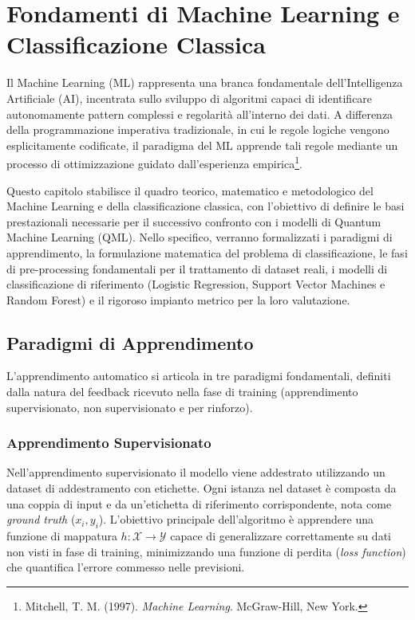 \chapter{Fondamenti di Machine Learning e Classificazione Classica}
\label{cap:fondamenti_ml_classificazione_classica}

Il Machine Learning (ML) rappresenta una branca fondamentale dell'Intelligenza Artificiale (AI), incentrata sullo sviluppo di algoritmi capaci di identificare autonomamente pattern complessi e regolarità all'interno dei dati. A differenza della programmazione imperativa tradizionale, in cui le regole logiche vengono esplicitamente codificate, il paradigma del ML apprende tali regole mediante un processo di ottimizzazione guidato dall'esperienza empirica\footnote{Mitchell, T. M. (1997). \textit{Machine Learning}. McGraw-Hill, New York.}.

Questo capitolo stabilisce il quadro teorico, matematico e metodologico del Machine Learning e della classificazione classica, con l'obiettivo di definire le basi prestazionali necessarie per il successivo confronto con i modelli di Quantum Machine Learning (QML). Nello specifico, verranno formalizzati i paradigmi di apprendimento, la formulazione matematica del problema di classificazione, le fasi di pre-processing fondamentali per il trattamento di dataset reali, i modelli di classificazione di riferimento (Logistic Regression, Support Vector Machines e Random Forest) e il rigoroso impianto metrico per la loro valutazione. \\


\section{Paradigmi di Apprendimento}

L'apprendimento automatico si articola in tre paradigmi fondamentali, definiti dalla natura del feedback ricevuto nella fase di training (apprendimento supervisionato, non supervisionato e per rinforzo).

\subsection{Apprendimento Supervisionato}
Nell'apprendimento supervisionato il modello viene addestrato utilizzando un dataset di addestramento con etichette. Ogni istanza nel dataset è composta da una coppia di input e da un'etichetta di riferimento corrispondente, nota come \textit{ground truth} ($x_i, y_i$). L'obiettivo principale dell'algoritmo è apprendere una funzione di mappatura $h: \mathcal{X} \to \mathcal{Y}$ capace di generalizzare correttamente su dati non visti in fase di training, minimizzando una funzione di perdita (\textit{loss function}) che quantifica l'errore commesso nelle previsioni.

